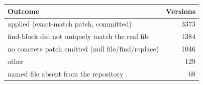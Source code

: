 \begin{tabular}{lr}
\toprule
Outcome & Versions \\
\midrule
applied (exact-match patch, committed) & 3373 \\
find-block did not uniquely match the real file & 1384 \\
no concrete patch emitted (null file/find/replace) & 1046 \\
other & 129 \\
named file absent from the repository & 68 \\
\bottomrule
\end{tabular}
